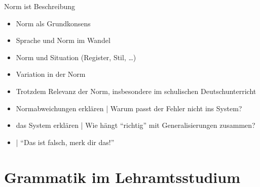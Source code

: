 \begin{frame}
  {Norm ist Beschreibung}
  \onslide<+->
  \begin{itemize}[<+->]
    \item Norm als Grundkonsens
    \item Sprache und Norm im Wandel
    \item Norm und Situation (Register, Stil, \dots)
    \item Variation in der Norm
      \Zeile
    \item Trotzdem \alert{Relevanz der Norm, insbesondere im schulischen Deutschunterricht}
    \item \alert{Normabweichungen erklären} | Warum passt der Fehler nicht ins System?
    \item \alert{das System erklären} | Wie hängt "`richtig"' mit Generalisierungen zusammen?
    \item {} | "`Das ist falsch, merk dir das!"'
  \end{itemize}
\end{frame}


\section{Grammatik im Lehramtsstudium}

